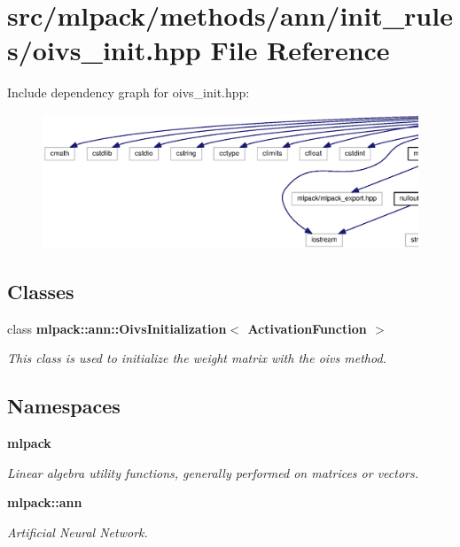 \section{src/mlpack/methods/ann/init\+\_\+rules/oivs\+\_\+init.hpp File Reference}
\label{oivs__init_8hpp}
Include dependency graph for oivs\+\_\+init.\+hpp\+:
\nopagebreak
\begin{figure}[H]
\begin{center}
\leavevmode
\includegraphics[width=350pt]{oivs__init_8hpp__incl}
\end{center}
\end{figure}
\subsection*{Classes}
\begin{DoxyCompactItemize}
\item 
class {\bf mlpack\+::ann\+::\+Oivs\+Initialization$<$ Activation\+Function $>$}
\begin{DoxyCompactList}\small\item\em This class is used to initialize the weight matrix with the oivs method. \end{DoxyCompactList}\end{DoxyCompactItemize}
\subsection*{Namespaces}
\begin{DoxyCompactItemize}
\item 
 {\bf mlpack}
\begin{DoxyCompactList}\small\item\em Linear algebra utility functions, generally performed on matrices or vectors. \end{DoxyCompactList}\item 
 {\bf mlpack\+::ann}
\begin{DoxyCompactList}\small\item\em Artificial Neural Network. \end{DoxyCompactList}\end{DoxyCompactItemize}


